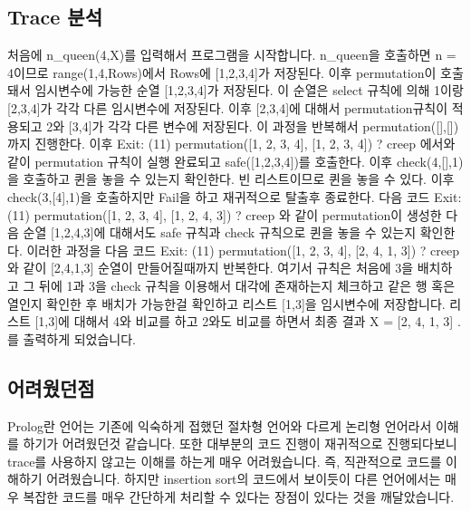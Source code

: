\documentclass{article}
\begin{document}
\subsection{Trace 분석}
처음에 n\_queen(4,X)를 입력해서 프로그램을 시작합니다. n\_queen을 호출하면 n = 4이므로 range(1,4,Rows)에서 Rows에 [1,2,3,4]가 저장된다. 이후 permutation이 호출돼서 임시변수에 가능한 순열 [1,2,3,4]가 저장된다. 이 순열은 select 규칙에 의해 1이랑 [2,3,4]가 각각 다른 임시변수에 저장된다. 이후 [2,3,4]에 대해서 permutation규칙이 적용되고 2와 [3,4]가 각각 다른 변수에 저장된다. 이 과정을 반복해서 permutation([],[])까지 진행한다. 이후
Exit: (11) permutation([1, 2, 3, 4], [1, 2, 3, 4]) ? creep 에서와 같이 permutation 규칙이 실행 완료되고 safe([1,2,3,4])를 호출한다. 이후 check(4,[],1) 을 호출하고 퀸을 놓을 수 있는지 확인한다. 빈 리스트이므로 퀸을 놓을 수 있다. 이후 check(3,[4],1)을 호출하지만 Fail을 하고 재귀적으로 탈출후 종료한다. 다음 코드  Exit: (11) permutation([1, 2, 3, 4], [1, 2, 4, 3]) ? creep 와 같이 permutation이 생성한 다음 순열 [1,2,4,3]에 대해서도 safe 규칙과 check 규칙으로 퀸을 놓을 수 있는지 확인한다. 이러한 과정을 다음 코드    Exit: (11) permutation([1, 2, 3, 4], [2, 4, 1, 3]) ? creep 와 같이 [2,4,1,3] 순열이 만들어질때까지 반복한다. 여기서 규칙은 처음에 3을 배치하고 그 뒤에 1과 3을 check 규칙을 이용해서 대각에 존재하는지 체크하고 같은 행 혹은 열인지 확인한 후 배치가 가능한걸 확인하고 리스트 [1,3]을 임시변수에 저장합니다. 리스트 [1,3]에 대해서 4와 비교를 하고 2와도 비교를 하면서 최종 결과 X = [2, 4, 1, 3] .를 출력하게 되었습니다.
\subsection{어려웠던점}
Prolog란 언어는 기존에 익숙하게 접했던 절차형 언어와 다르게 논리형 언어라서 이해를 하기가 어려웠던것 같습니다. 또한 대부분의 코드 진행이 재귀적으로 진행되다보니 trace를 사용하지 않고는 이해를 하는게 매우 어려웠습니다. 즉, 직관적으로 코드를 이해하기 어려웠습니다. 하지만 insertion sort의 코드에서 보이듯이 다른 언어에서는 매우 복잡한 코드를 매우 간단하게 처리할 수 있다는 장점이 있다는 것을 깨달았습니다. 
\end{document}
